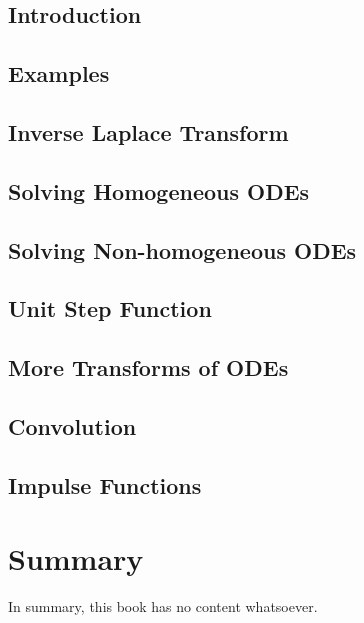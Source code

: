 \documentclass[
  letterpaper,
]{report}
\begin{document}
\section{Introduction}\label{introduction-3}

\section{Examples}\label{examples}

\section{Inverse Laplace Transform}\label{inverse-laplace-transform}

\section{Solving Homogeneous ODEs}\label{solving-homogeneous-odes}

\section{Solving Non-homogeneous
ODEs}\label{solving-non-homogeneous-odes}

\section{Unit Step Function}\label{unit-step-function}

\section{More Transforms of ODEs}\label{more-transforms-of-odes}

\section{Convolution}\label{convolution}

\section{Impulse Functions}\label{impulse-functions}


\chapter{Summary}\label{summary}

In summary, this book has no content whatsoever.
\end{document}
